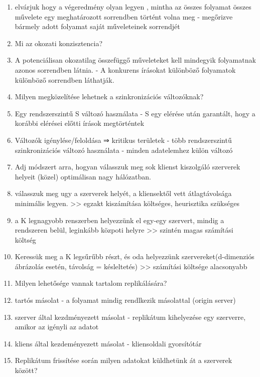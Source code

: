 \documentclass[twoside, a4paper, 12pt]{article}
\begin{document}
\begin{enumerate}
            \item elvárjuk hogy a végeredmény olyan legyen , mintha az összes folyamat összes művelete
                egy meghatározott sorrendben történt volna meg
                - megőrizve bármely adott folyamat saját műveleteinek sorrendjét
            \item  Mi az okozati konzisztencia?
            \item A potenciálisan okozatilag összefüggő műveleteket kell mindegyik folyamatnak azonos sorrendben látnia.
                - A konkurens írásokat különböző folyamatok különböző sorrendben láthatják.
            \item  Milyen megközelítése lehetnek a szinkronizációs változóknak?
            \item Egy rendszerszintű S változó használata
                - S egy elérése után garantált, hogy a korábbi elérései előtti írások megtörténtek
            \item Változók  igénylése/feloldása ⇒ kritikus területek
                - több rendszerszintű szinkronizációs változó használata
                - minden adatelemhez külön változó
            \item  Adj módszert arra, hogyan válasszuk meg sok klienst kiszolgáló szerverek helyeit (közel) optimálisan nagy hálózatban.
            \item válasszuk meg ugy a szerverek helyét, a kliensektől vett átlagtávolsága minimális legyen.
                >> egzakt kiszámítása költséges, heurisztika szükséges
            \item a K legnagyobb renszerben helyezzünk el egy-egy szervert, mindig a rendszeren belül, leginkább közpoti helyre
                >>  szintén magas számítási költség
            \item Keressük meg a K legsűrűbb részt, és oda helyezzünk szervereket(d-dimenziós ábrázolás esetén, távolság = késleltetés)
                >> számítási költsége alacsonyabb	
            \item  Milyen lehetősége vannak tartalom replikálására?
            \item tartós másolat
                - a folyamat mindig rendlkezik másolattal (origin server)
            \item szerver által kezdményezett másolat
                - replikátum kihelyezése egy szerverre, amikor az igényli az adatot
            \item kliens által kezdeményezett másolat
                - kliensoldali gyorsítótár
            \item  Replikátum frissítése során milyen adatokat küldhetünk át a szerverek között?

\end{enumerate}
\end{document}
